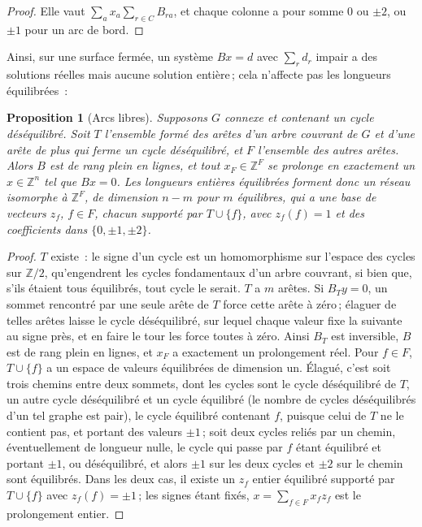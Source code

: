 \documentclass[11pt,a4paper]{article}
\newtheorem{proposition}{Proposition}
\newcommand{\Z}{\mathbb{Z}}
\newcommand{\lean}[1]{\texttt{\detokenize{#1}}}
\newenvironment{evidence}[3][]{}{}
\begin{document}
\begin{proof}
Elle vaut $\sum_a x_a \sum_{r \in C} B_{ra}$, et chaque colonne a pour somme
$0$ ou $\pm2$, ou $\pm1$ pour un arc de bord.
\end{proof}

Ainsi, sur une surface fermée, un système $Bx = d$ avec $\sum_r d_r$ impair a
des solutions réelles mais aucune solution entière\,; cela n'affecte pas les
longueurs équilibrées~:

\begin{evidence}{core}{\lean{TMesh.free_arcs}, \lean{free_arcs}, \lean{free_arcs_of_cycle}\,; supposé~: le graphe est connexe (un arbre couvrant)}
\begin{proposition}[Arcs libres]\label{prop:free}
Supposons $G$ connexe et contenant un cycle déséquilibré. Soit $T$ l'ensemble
formé des arêtes d'un arbre couvrant de $G$ et d'une arête de plus qui ferme
un cycle déséquilibré, et $F$ l'ensemble des autres arêtes. Alors $B$ est de
rang plein en lignes, et tout $x_F \in \Z^F$ se prolonge en exactement un $x
\in \Z^n$ tel que $Bx = 0$. Les longueurs entières équilibrées forment donc un
réseau isomorphe à $\Z^F$, de dimension $n - m$ pour $m$ équilibres, qui a une
base de vecteurs $z_f$, $f \in F$, chacun supporté par $T \cup \{f\}$, avec
$z_f(f) = 1$ et des coefficients dans $\{0, \pm1, \pm2\}$.
\end{proposition}
\end{evidence}

\begin{proof}
$T$ existe~: le signe d'un cycle est un homomorphisme sur l'espace des cycles
sur $\Z/2$, qu'engendrent les cycles fondamentaux d'un arbre couvrant, si bien
que, s'ils étaient tous équilibrés, tout cycle le serait. $T$ a $m$ arêtes. Si
$B_T y = 0$, un sommet rencontré par une seule arête de $T$ force cette arête
à zéro\,; élaguer de telles arêtes laisse le cycle déséquilibré, sur lequel
chaque valeur fixe la suivante au signe près, et en faire le tour les force
toutes à zéro. Ainsi $B_T$ est inversible, $B$ est de rang plein en lignes,
et $x_F$ a exactement un prolongement réel. Pour $f \in F$, $T \cup \{f\}$ a
un espace de valeurs équilibrées de dimension un. Élagué, c'est soit trois
chemins entre deux sommets, dont les cycles sont le cycle déséquilibré de $T$,
un autre cycle déséquilibré et un cycle équilibré (le nombre de cycles
déséquilibrés d'un tel graphe est pair), le cycle équilibré contenant $f$,
puisque celui de $T$ ne le contient pas, et portant des valeurs $\pm1$\,; soit
deux cycles reliés par un chemin, éventuellement de longueur nulle, le cycle
qui passe par $f$ étant équilibré et portant $\pm1$, ou déséquilibré, et alors
$\pm1$ sur les deux cycles et $\pm2$ sur le chemin sont équilibrés. Dans les
deux cas, il existe un $z_f$ entier équilibré supporté par $T \cup \{f\}$ avec
$z_f(f) = \pm1$\,; les signes étant fixés, $x = \sum_{f \in F} x_f z_f$ est le
prolongement entier.
\end{proof}
\end{document}

